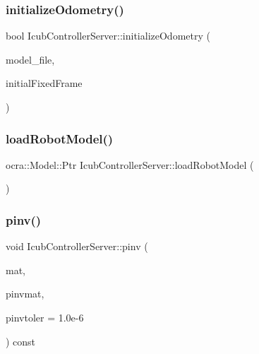 \hypertarget{classIcubControllerServer_a810f139a27e06458549ccbb3fde12359}{}\label{classIcubControllerServer_a810f139a27e06458549ccbb3fde12359} 
\subsubsection{\texorpdfstring{initialize\+Odometry()}{initializeOdometry()}}
{\footnotesize\ttfamily bool Icub\+Controller\+Server\+::initialize\+Odometry (\begin{DoxyParamCaption}\item[{std\+::string}]{model\+\_\+file,  }\item[{std\+::string}]{initial\+Fixed\+Frame }\end{DoxyParamCaption})}

\hypertarget{classIcubControllerServer_a025d8e257a69ef3d2c5a10b3cbfe2350}{}\label{classIcubControllerServer_a025d8e257a69ef3d2c5a10b3cbfe2350} 
\subsubsection{\texorpdfstring{load\+Robot\+Model()}{loadRobotModel()}}
{\footnotesize\ttfamily ocra\+::\+Model\+::\+Ptr Icub\+Controller\+Server\+::load\+Robot\+Model (\begin{DoxyParamCaption}{ }\end{DoxyParamCaption})\hspace{0.3cm}{\ttfamily [virtual]}}

\hypertarget{classIcubControllerServer_af43586b816992e5e7fceac5a7245f673}{}\label{classIcubControllerServer_af43586b816992e5e7fceac5a7245f673} 
\subsubsection{\texorpdfstring{pinv()}{pinv()}}
{\footnotesize\ttfamily void Icub\+Controller\+Server\+::pinv (\begin{DoxyParamCaption}\item[{Eigen\+::\+Matrix\+Xd}]{mat,  }\item[{Eigen\+::\+Matrix\+Xd \&}]{pinvmat,  }\item[{double}]{pinvtoler = {\ttfamily 1.0e-\/6} }\end{DoxyParamCaption}) const}

